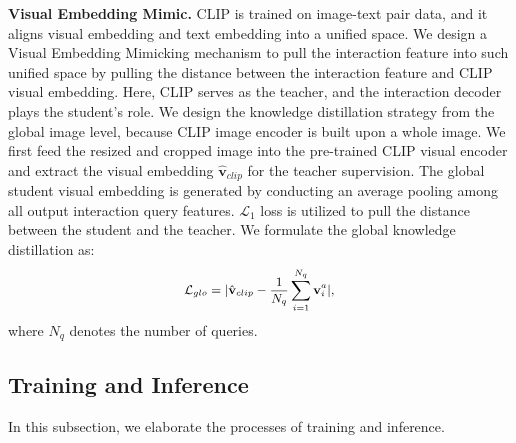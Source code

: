 \documentclass[10pt,twocolumn,letterpaper]{article}
\begin{document}
\vspace{1mm}\noindent\textbf{Visual Embedding Mimic.}
 CLIP is trained on image-text pair data, and it aligns visual embedding and text embedding into a unified space. We design a Visual Embedding Mimicking mechanism to pull the interaction feature into such unified space by pulling the distance between the interaction feature and CLIP visual embedding. 
Here, CLIP serves as the teacher, and the interaction decoder plays the student's role. We design the knowledge distillation strategy from the global image level, because CLIP image encoder is built upon a whole image. We first feed the resized and cropped image into the pre-trained CLIP visual encoder and extract the visual embedding $\hat{\mathbf{v}}_{clip}$ for the teacher supervision. The global student visual embedding is generated by conducting an average pooling among all output interaction query features. $\mathcal{L}_1$ loss is utilized to pull the distance between the student and the teacher. We formulate the global knowledge distillation as:
\begin{equation}
\small
\begin{aligned}
\mathcal{L}_{glo} =|\hat{\mathbf{v}}_{clip}  - \frac{1}{N_q}\sum_{i=1}^{N_q}\mathbf{v}_{i}^a|, 
\end{aligned}
\end{equation}
where $N_q$ denotes the number of queries.

\vspace{-1mm}\subsection{Training and Inference} \label{sec:train}\vspace{-1mm}
In this subsection, we elaborate the processes of training and inference.
\end{document}
